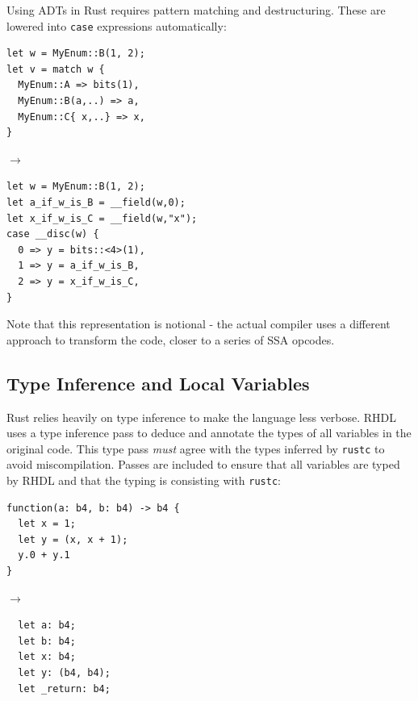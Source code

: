 \documentclass[sigplan,screen,sigconf]{acmart}
\begin{document}
Using ADTs in Rust requires pattern matching and destructuring.  These are lowered into \verb|case| expressions automatically:
\begin{center}
\begin{minipage}{3.1cm}
\begin{verbatim}
let w = MyEnum::B(1, 2);
let v = match w {
  MyEnum::A => bits(1),
  MyEnum::B(a,..) => a,
  MyEnum::C{ x,..} => x,
}
\end{verbatim}
\end{minipage}
$\rightarrow$
\begin{minipage}{4.1cm}
\begin{verbatim}
let w = MyEnum::B(1, 2);
let a_if_w_is_B = __field(w,0); 
let x_if_w_is_C = __field(w,"x");
case __disc(w) {
  0 => y = bits::<4>(1),
  1 => y = a_if_w_is_B,
  2 => y = x_if_w_is_C,
}
\end{verbatim}
\end{minipage}
\end{center}
Note that this representation is notional - the actual compiler uses a different approach to transform the code, closer to a series of SSA opcodes.

\subsection{Type Inference and Local Variables}
Rust relies heavily on type inference to make the language less verbose.  RHDL uses a type inference pass to deduce and annotate the types of all variables in the original code.  This type pass \emph{must} agree with the types inferred by \verb|rustc| to avoid miscompilation.  Passes are included to ensure that all variables are typed by RHDL and that the typing is consisting with \verb|rustc|:
\begin{center}
\begin{minipage}{4cm}
\begin{verbatim}
function(a: b4, b: b4) -> b4 {
  let x = 1;
  let y = (x, x + 1);
  y.0 + y.1
}
\end{verbatim}
\end{minipage}
$\rightarrow$
\begin{minipage}{3cm}
\begin{verbatim}
  let a: b4;
  let b: b4;
  let x: b4;
  let y: (b4, b4);
  let _return: b4;
\end{verbatim}
\end{minipage}
\end{center}
\end{document}
